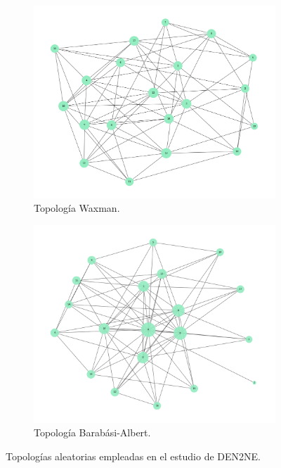 \begin{figure}[ht!]
    \centering
    \begin{subfigure}[t]{0.45\textwidth}
        \centering
        \includegraphics[width=\linewidth]{fig/05_den2ne/den2ne_15a.png}
        \caption{Topología Waxman.}
        \label{fig:waxman}
    \end{subfigure}
    \hfill
    \begin{subfigure}[t]{0.45\textwidth}
        \centering
        \includegraphics[width=\linewidth]{fig/05_den2ne/den2ne_15b.png}
        \caption{Topología Barabási-Albert.}
        \label{fig:barabasi}
    \end{subfigure}
    \caption{Topologías aleatorias empleadas en el estudio de DEN2NE.}
    \label{fig:den2ne_15}
\end{figure}

